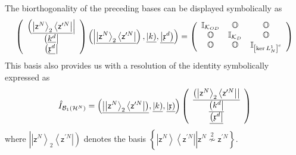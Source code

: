 \documentclass[aps,preprint]{revtex4}%
\begin{document}
The biorthogonality of the preceding bases can be displayed symbolically as%
\begin{equation}
\left(
\begin{array}
[c]{c}%
\left(  \underline{\left\vert \mathsf{z}^{N}\right\rangle _{2}\left\langle
\mathsf{z}^{\prime N}\right\vert }\right\vert \\
\left(  \underline{k^{d}}\right\vert \\
\left(  \underline{\mathfrak{x}^{d}}\right\vert
\end{array}
\right)  \left(  \left\vert \underline{\left\vert \mathsf{z}^{N}\right\rangle
_{2}\left\langle \mathsf{z}^{\prime N}\right\vert }\right)  ,\underline
{\left\vert k\right)  },\underline{\left\vert \mathfrak{x}^{d}\right)
}\right)  =\left(
\begin{array}
[c]{ccc}%
\mathbb{I}_{\mathcal{K}_{OD}} & \mathbb{O} & \mathbb{O}\\
\mathbb{O} & \mathbb{I}_{\mathcal{K}_{D}} & \mathbb{O}\\
\mathbb{O} & \mathbb{O} & \mathbb{I}_{\left[  \ker L_{N}^{1}\right]  ^{c}}%
\end{array}
\right)
\end{equation}
This basis also provides us with a resolution of the identity symbolically
expressed as%
\begin{equation}
\hat{I}_{\mathcal{B}_{1}\left(  \mathcal{H}^{N}\right)  }=\left(
\underline{\left\vert \left\vert \mathsf{z}^{N}\right\rangle _{2}\left\langle
\mathsf{z}^{\prime N}\right\vert \right)  },\underline{\left\vert k\right)
},\underline{\left\vert \mathfrak{x}\right)  }\right)  \left(
\begin{array}
[c]{c}%
\underline{\left(  \left\vert \mathsf{z}^{N}\right\rangle _{2}\left\langle
\mathsf{z}^{\prime N}\right\vert \right\vert }\\
\underline{\left(  k^{d}\right\vert }\\
\underline{\left(  \mathfrak{x}^{d}\right\vert }%
\end{array}
\right)  \label{rescan}%
\end{equation}
where $\left\vert \left\vert \mathsf{z}^{N}\right\rangle _{2}\left\langle
\mathsf{z}^{\prime N}\right\vert \right)  $ denotes the basis $\left\{
\left\vert \mathsf{z}^{N}\right\rangle \left\langle \mathsf{z}^{\prime
N}\right\vert \left\vert \mathsf{z}^{N}\overset{2}{\nsim}\mathsf{z}^{\prime
N}\right.  \right\}  $.
\end{document}
